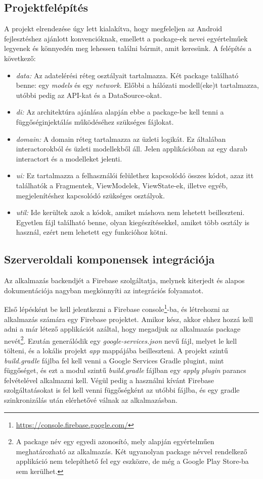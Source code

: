 \subsection{Projektfelépítés}
A projekt elrendezése úgy lett kialakítva, hogy megfeleljen az Android fejlesztéshez ajánlott konvencióknak, emellett a package-ek nevei egyértelműek legyenek és könnyedén meg lehessen találni bármit, amit keresünk. A felépítés a következő:
\begin{itemize}
	\item \emph{data:} Az adatelérési réteg osztályait tartalmazza. Két package található benne: egy \emph{models} és egy \emph{network}. Előbbi a hálózati modell(eke)t tartalmazza, utóbbi pedig az API-kat és a DataSource-okat.
	\item \emph{di:} Az architektúra ajánlása alapján ebbe a package-be kell tenni a függőséginjektálás működéséhez szükséges fájlokat.
	\item \emph{domain:} A domain réteg tartalmazza az üzleti logikát. Ez általában interactorokból és üzleti modellekből áll. Jelen applikációban az egy darab interactort és a modelleket jelenti.
	\item \emph{ui:} Ez tartalmazza a felhasználói felülethez kapcsolódó összes kódot, azaz itt találhatók a Fragmentek, ViewModelek, ViewState-ek, illetve egyéb, megjelenítéshez kapcsolódó szükséges osztályok.
	\item \emph{util:} Ide kerültek azok a kódok, amiket máshova nem lehetett beilleszteni. Egyetlen fájl található benne, olyan kiegészítésekkel, amiket több osztály is használ, ezért nem lehetett egy funkcióhoz kötni.
\end{itemize}

\subsection{Szerveroldali komponensek integrációja}
Az alkalmazás backendjét a Firebase szolgáltatja, melynek kiterjedt és alapos dokumentációja nagyban megkönnyíti az integrációs folyamatot.

Első lépésként be kell jelentkezni a Firebase console\footnote{\url{https://console.firebase.google.com/}}-ba, és létrehozni az alkalmazás számára egy Firebase projektet. Amikor kész, akkor ehhez hozzá kell adni a már létező applikációt azáltal, hogy megadjuk az alkalmazás package nevét\footnote{A package név egy egyedi azonosító, mely alapján egyértelműen meghatározható az alkalmazás. Két ugyanolyan package névvel rendelkező applikáció nem telepíthető fel egy eszközre, de még a Google Play Store-ba sem kerülhet.}. Ezután generálódik egy \emph{google-services.json} nevű fájl, melyet le kell tölteni, és a lokális projekt \emph{app} mappájába beilleszteni. A projekt szintű \emph{build.gradle} fájlba fel kell venni a Google Services Gradle plugint, mint függőséget, és ezt a modul szintű \emph{build.gradle} fájlban egy \emph{apply plugin} parancs felvételével alkalmazni kell. Végül pedig a használni kívánt Firebase szolgáltatásokat is fel kell venni függőségként az utóbbi fájlba, és egy gradle szinkronizálás után elérhetővé válnak az alkalmazásban.

